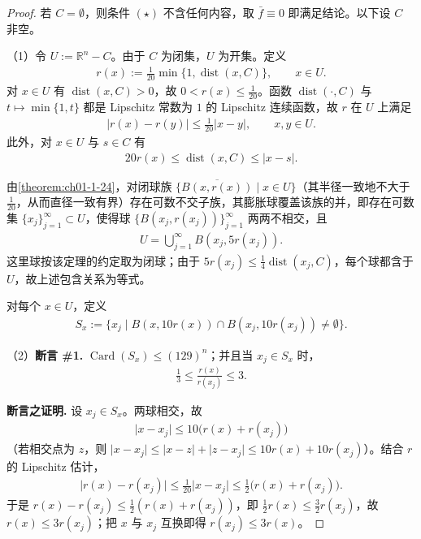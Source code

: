 \documentclass[../../main.tex]{subfiles}%
\begin{document}
\begin{proof}
若 $C=\emptyset$，则条件 $(\star)$ 不含任何内容，取 $\bar f\equiv0$ 即满足结论。以下设 $C$ 非空。

（1）令 $U:=\mathbb{R}^n-C$。由于 $C$ 为闭集，$U$ 为开集。定义
\begin{align*}
r(x):=\frac{1}{20}\min\{1,\operatorname{dist}(x,C)\},\qquad x\in U.
\end{align*}
对 $x\in U$ 有 $\operatorname{dist}(x,C)>0$，故 $0<r(x)\leqslant\frac{1}{20}$。函数 $\operatorname{dist}(\cdot,C)$ 与 $t\mapsto\min\{1,t\}$ 都是 Lipschitz 常数为 $1$ 的 Lipschitz 连续函数，故 $r$ 在 $U$ 上满足
\begin{align*}
\lvert r(x)-r(y)\rvert\leqslant\frac{1}{20}\lvert x-y\rvert,\qquad x,y\in U.
\end{align*}
此外，对 $x\in U$ 与 $s\in C$ 有
\begin{align*}
20r(x)\leqslant\operatorname{dist}(x,C)\leqslant\lvert x-s\rvert.
\end{align*}

由\cref{theorem:ch01-1-24}，对闭球族 $\{\overline{B(x,r(x))}\mid x\in U\}$（其半径一致地不大于 $\frac{1}{20}$，从而直径一致有界）存在可数不交子族，其膨胀球覆盖该族的并，即存在可数集 $\{x_j\}_{j=1}^{\infty}\subset U$，使得球 $\{B(x_j,r(x_j))\}_{j=1}^{\infty}$ 两两不相交，且%
\begin{align*}
U=\bigcup_{j=1}^{\infty}B(x_j,5r(x_j)).
\end{align*}
这里球按该定理的约定取为闭球；由于 $5r(x_j)\leqslant\frac{1}{4}\operatorname{dist}(x_j,C)$，每个球都含于 $U$，故上述包含关系为等式。

对每个 $x\in U$，定义
\begin{align*}
S_x:=\{x_j\mid B(x,10r(x))\cap B(x_j,10r(x_j))\neq\emptyset\}.
\end{align*}

（2）\textbf{断言 \#1.} $\operatorname{Card}(S_x)\leqslant(129)^n$；并且当 $x_j\in S_x$ 时，
\begin{align*}
\frac{1}{3}\leqslant\frac{r(x)}{r(x_j)}\leqslant3.
\end{align*}

\textbf{断言之证明.} 设 $x_j\in S_x$。两球相交，故
\begin{align*}
\lvert x-x_j\rvert\leqslant10\bigl(r(x)+r(x_j)\bigr)
\end{align*}
（若相交点为 $z$，则 $\lvert x-x_j\rvert\leqslant\lvert x-z\rvert+\lvert z-x_j\rvert\leqslant10r(x)+10r(x_j)$）。结合 $r$ 的 Lipschitz 估计，
\begin{align*}
\lvert r(x)-r(x_j)\rvert\leqslant\frac{1}{20}\lvert x-x_j\rvert\leqslant\frac{1}{2}\bigl(r(x)+r(x_j)\bigr).
\end{align*}
于是 $r(x)-r(x_j)\leqslant\frac{1}{2}(r(x)+r(x_j))$，即 $\frac{1}{2}r(x)\leqslant\frac{3}{2}r(x_j)$，故 $r(x)\leqslant3r(x_j)$；把 $x$ 与 $x_j$ 互换即得 $r(x_j)\leqslant3r(x)$。


\end{proof}
\end{document}
